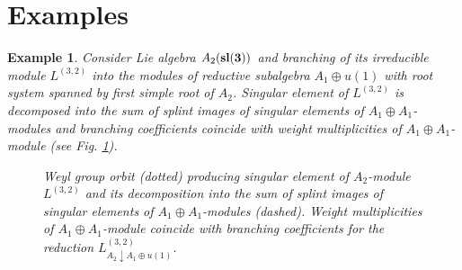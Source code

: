\documentclass[12pt]{article}
\newtheorem{example}{Example}[section]
\begin{document}
\section{Examples}
\label{sec:examples}
\begin{example}
  Consider Lie algebra $A_{2} (\bf{sl}(3))$ and branching of its irreducible module $L^{(3,2)}$ into the modules of reductive subalgebra $A_{1}\oplus u(1)$ with root system spanned by first simple root of $A_{2}$. Singular element of $L^{(3,2)}$ is decomposed into the sum of splint images of singular elements of $A_{1}\oplus A_{1}$-modules and branching coefficients coincide with weight multiplicities of $A_{1}\oplus A_{1}$-module (see Fig. \ref{fig:a2_splint}).

  \begin{figure}[h!bt]
  \noindent{}
  \caption{Weyl group orbit (dotted) producing singular element of $A_{2}$-module $L^{(3,2)}$ and its decomposition into the sum of splint images of singular elements of $A_{1}\oplus A_{1}$-modules (dashed). Weight multiplicities of $A_{1}\oplus A_{1}$-module coincide with branching coefficients for the reduction $L^{(3,2)}_{A_{2}\downarrow A_{1}\oplus u(1)}$.}

 \label{fig:a2_splint}
\end{figure}
\end{example}
\end{document}
